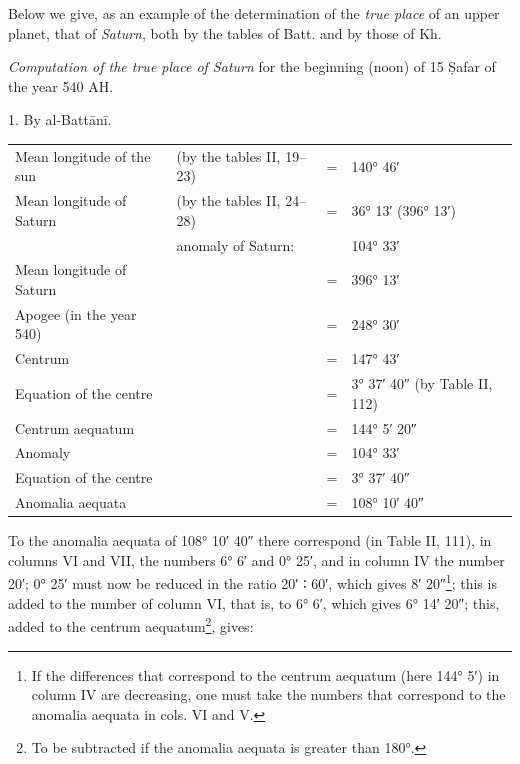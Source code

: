 \documentclass[11pt]{article}
\begin{document}
\par Below we give, as an example of the determination of the \emph{true place} of an upper planet, that of \emph{Saturn}, both by the tables of Batt. and by those of Kh.\par
\par \emph{Computation of the true place of Saturn} for the beginning (noon) of 15 Ṣafar of the year 540 AH.\par
\par\begin{center}1. By al-Battānī.\end{center}
\begin{center}\small\begin{tabular}{llcl}
Mean longitude of the sun & (by the tables II, 19–23) & = & 140° 46′ \\
Mean longitude of Saturn & (by the tables II, 24–28) & = & 36° 13′ (396° 13′) \\
 & anomaly of Saturn: &  & 104° 33′ \\
Mean longitude of Saturn &  & = & 396° 13′ \\
Apogee (in the year 540)\footnotemark{} &  & = & 248° 30′ \\
Centrum &  & = & 147° 43′ \\
Equation of the centre &  & = & 3° 37′ 40″\footnotemark{} (by Table II, 112) \\
Centrum aequatum &  & = & 144° 5′ 20″ \\
Anomaly &  & = & 104° 33′ \\
Equation of the centre &  & = & 3° 37′ 40″ \\
Anomalia aequata &  & = & 108° 10′ 40″ \\
\end{tabular}\end{center}
\addtocounter{footnote}{-2}
\par To the anomalia aequata of 108° 10′ 40″ there correspond (in Table II, 111), in columns VI and VII, the numbers 6° 6′ and 0° 25′, and in column IV the number 20′; 0° 25′ must now be reduced in the ratio 20′ {\SignFont\upshape ∶} 60′, which gives 8′ 20″\footnote{If the differences that correspond to the centrum aequatum (here 144° 5′) in column IV are decreasing, one must take the numbers that correspond to the anomalia aequata in cols. VI and V.}; this is added to the number of column VI, that is, to 6° 6′, which gives 6° 14′ 20″; this, added to the centrum aequatum\footnote{To be subtracted if the anomalia aequata is greater than 180°.}, gives:\par
\end{document}
